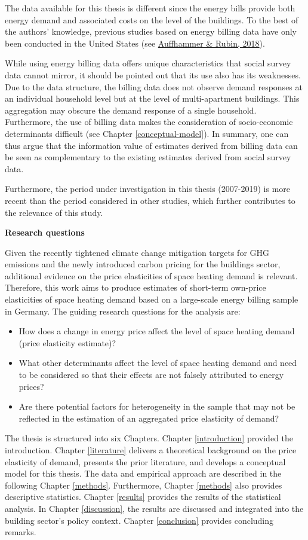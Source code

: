 \documentclass[12pt,twoside]{reedthesis}
\providecommand{\tightlist}{%
  \setlength{\itemsep}{0pt}\setlength{\parskip}{0pt}}
\begin{document}
The data available for this thesis is different since the energy bills provide both energy demand and associated costs on the level of the buildings. To the best of the authors' knowledge, previous studies based on energy billing data have only been conducted in the United States (see \protect\hyperlink{ref-auffhammer_rubin18}{Auffhammer \& Rubin, 2018}).

While using energy billing data offers unique characteristics that social survey data cannot mirror, it should be pointed out that its use also has its weaknesses. Due to the data structure, the billing data does not observe demand responses at an individual household level but at the level of multi-apartment buildings. This aggregation may obscure the demand response of a single household. Furthermore, the use of billing data makes the consideration of socio-economic determinants difficult (see Chapter \ref{conceptual-model}). In summary, one can thus argue that the information value of estimates derived from billing data can be seen as complementary to the existing estimates derived from social survey data.

Furthermore, the period under investigation in this thesis (2007-2019) is more recent than the period considered in other studies, which further contributes to the relevance of this study.

\textbf{Research questions}

Given the recently tightened climate change mitigation targets for GHG emissions and the newly introduced carbon pricing for the buildings sector, additional evidence on the price elasticities of space heating demand is relevant. Therefore, this work aims to produce estimates of short-term own-price elasticities of space heating demand based on a large-scale energy billing sample in Germany. The guiding research questions for the analysis are:
\begin{itemize}
\tightlist
\item
  How does a change in energy price affect the level of space heating demand (price elasticity estimate)?
\item
  What other determinants affect the level of space heating demand and need to be considered so that their effects are not falsely attributed to energy prices?
\item
  Are there potential factors for heterogeneity in the sample that may not be reflected in the estimation of an aggregated price elasticity of demand?
\end{itemize}
The thesis is structured into six Chapters. Chapter \ref{introduction} provided the introduction. Chapter \ref{literature} delivers a theoretical background on the price elasticity of demand, presents the prior literature, and develops a conceptual model for this thesis. The data and empirical approach are described in the following Chapter \ref{methods}. Furthermore, Chapter \ref{methods} also provides descriptive statistics. Chapter \ref{results} provides the results of the statistical analysis. In Chapter \ref{discussion}, the results are discussed and integrated into the building sector's policy context. Chapter \ref{conclusion} provides concluding remarks.
\end{document}
